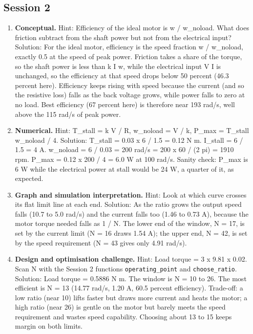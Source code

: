 \documentclass[11pt,a4paper]{article}
\begin{document}
\subsection*{Session 2}
\begin{enumerate}[nosep]
\item \textbf{Conceptual.} Hint: Efficiency of the ideal motor is w / w\_noload. What does friction subtract from the shaft power but not from the electrical input? Solution: For the ideal motor, efficiency is the speed fraction w / w\_noload, exactly 0.5 at the speed of peak power. Friction takes a share of the torque, so the shaft power is less than k I w, while the electrical input V I is unchanged, so the efficiency at that speed drops below 50 percent (46.3 percent here). Efficiency keeps rising with speed because the current (and so the resistive loss) falls as the back voltage grows, while power falls to zero at no load. Best efficiency (67 percent here) is therefore near 193 rad/s, well above the 115 rad/s of peak power.
\item \textbf{Numerical.} Hint: T\_stall = k V / R, w\_noload = V / k, P\_max = T\_stall w\_noload / 4. Solution: T\_stall = 0.03 x 6 / 1.5 = 0.12 N m. I\_stall = 6 / 1.5 = 4 A. w\_noload = 6 / 0.03 = 200 rad/s = 200 x 60 / (2 pi) = 1910 rpm. P\_max = 0.12 x 200 / 4 = 6.0 W at 100 rad/s. Sanity check: P\_max is 6 W while the electrical power at stall would be 24 W, a quarter of it, as expected.
\item \textbf{Graph and simulation interpretation.} Hint: Look at which curve crosses its flat limit line at each end. Solution: As the ratio grows the output speed falls (10.7 to 5.0 rad/s) and the current falls too (1.46 to 0.73 A), because the motor torque needed falls as 1 / N. The lower end of the window, N = 17, is set by the current limit (N = 16 draws 1.54 A); the upper end, N = 42, is set by the speed requirement (N = 43 gives only 4.91 rad/s).
\item \textbf{Design and optimisation challenge.} Hint: Load torque = 3 x 9.81 x 0.02. Scan N with the Session 2 functions \texttt{operating\_point} and \texttt{choose\_ratio}. Solution: Load torque = 0.5886 N m. The window is N = 10 to 26. The most efficient is N = 13 (14.77 rad/s, 1.20 A, 60.5 percent efficiency). Trade-off: a low ratio (near 10) lifts faster but draws more current and heats the motor; a high ratio (near 26) is gentle on the motor but barely meets the speed requirement and wastes speed capability. Choosing about 13 to 15 keeps margin on both limits.
\end{enumerate}
\end{document}
